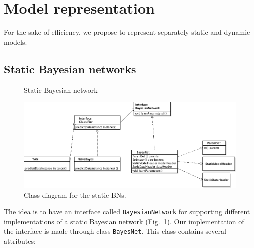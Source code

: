 \documentclass[a4paper,12pt]{article}
\begin{document}
\section{Model representation}\label{sec:modelRepresentation}

For the sake of efficiency, we propose to represent separately static and dynamic 
models. 


\subsection{Static Bayesian networks}
\label{subsec:staticBNs}


\begin{figure}[h]

\centering
{}
\caption{Static Bayesian network}
\label{fig:staticBN}
\end{figure}





\begin{figure}[h]
\includegraphics[width=\textwidth]{staticBN}
\caption{Class diagram for the static BNs.}
\label{fig:classDiagramStaticBN}
\end{figure}


The idea is to have an interface called \texttt{BayesianNetwork} for supporting 
different implementations of a static Bayesian network (Fig.~\ref{fig:staticBN}). Our implementation of the 
interface is made through class \texttt{BayesNet}. This class contains several 
attributes:
\end{document}
